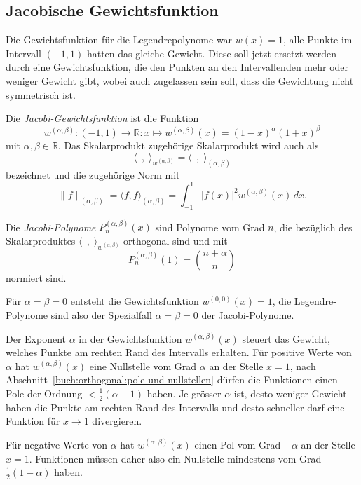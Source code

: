 %
%
\subsection{Jacobische Gewichtsfunktion}
Die Gewichtsfunktion für die Legendrepolynome war $w(x)=1$, alle
Punkte im Intervall $(-1,1)$ hatten das gleiche Gewicht.
Diese soll jetzt ersetzt werden durch eine Gewichtsfunktion, die
den Punkten an den Intervallenden mehr oder weniger Gewicht gibt,
wobei auch zugelassen sein soll, dass die Gewichtung nicht symmetrisch
ist.

\begin{definition}
Die {\em Jacobi-Gewichtsfunktion} ist die Funktion
\[
w^{(\alpha,\beta)}
\colon (-1,1)\to\mathbb{R}
:
x\mapsto w^{(\alpha,\beta)}(x) = (1-x)^\alpha(1+x)^\beta
\]
mit $\alpha,\beta\in\mathbb{R}$.
Das Skalarprodukt zugehörige Skalarprodukt wird auch als
\[
\langle\,\;,\;\rangle_{w^{(\alpha,\beta)}}
=
\langle\,\;,\;\rangle_{(\alpha,\beta)}
\]
bezeichnet und die zugehörige Norm mit
\[
\|f\|_{(\alpha,\beta)}
=
\langle f,f\rangle_{(\alpha,\beta)}
=
\int_{-1}^1 |f(x)|^2 w^{(\alpha,\beta)}(x)\,dx.
\]
\end{definition}

\begin{definition}
Die {\em Jacobi-Polynome} $P^{(\alpha,\beta)}_n(x)$ sind 
Polynome vom Grad $n$, die bezüglich des Skalarproduktes
$\langle\,\;,\;\rangle_{w^{(\alpha,\beta)}}$ orthogonal sind
und mit
\[
P_n^{(\alpha,\beta)}(1) = \binom{n+\alpha}n
\]
normiert sind.
\end{definition}

Für $\alpha=\beta=0$ entsteht die Gewichtsfunktion
$w^{(0,0)}(x)=1$, die Legendre-Polynome sind also der Spezialfall
$\alpha=\beta=0$ der Jacobi-Polynome.

Der Exponent $\alpha$ in der Gewichtsfunktion $w^{(\alpha,\beta)}(x)$
steuert das Gewicht, welches Punkte am rechten Rand des Intervalls
erhalten.
Für positive Werte von $\alpha$ hat $w^{(\alpha,\beta)}(x)$ eine
Nullstelle vom Grad $\alpha$ an der Stelle $x=1$, nach
Abschnitt~\ref{buch:orthogonal:pole-und-nullstellen}
dürfen die Funktionen einen Pole der Ordnung $<\frac12(\alpha-1)$ haben.
Je grösser $\alpha$ ist, desto weniger Gewicht haben die Punkte
am rechten Rand des Intervalls und desto schneller darf eine Funktion
für $x\to 1$ divergieren.

Für negative Werte von $\alpha$ hat $w^{(\alpha,\beta)}(x)$ einen
Pol vom Grad $-\alpha$ an der Stelle $x=1$.
Funktionen müssen daher also ein Nullstelle mindestens vom Grad
$\frac12(1-\alpha)$ haben.

